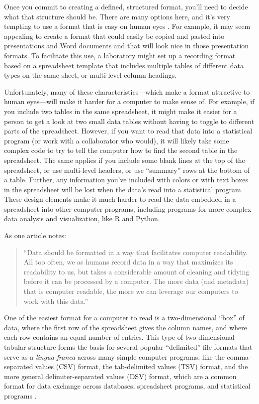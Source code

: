 \documentclass[]{tufte-book}
\begin{document}
Once you commit to creating a defined, structured format, you'll need to decide
what that structure should be. There are many options here, and it's very
tempting to use a format that is easy on human eyes
\citep{buffalo2015bioinformatics}. For example, it may seem appealing to create a
format that could easily be copied and pasted into presentations and Word
documents and that will look nice in those presentation formats. To facilitate
this use, a laboratory might set up a recording format based on a spreadsheet
template that includes multiple tables of different data types on the same
sheet, or multi-level column headings.

Unfortunately, many of these characteristics---which make a format attractive to
human eyes---will make it harder for a computer to make sense of. For example,
if you include two tables in the same spreadsheet, it might make it easier for a
person to get a look at two small data tables without having to toggle to
different parts of the spreadsheet. However, if you want to read that data into
a statistical program (or work with a collaborator who would), it will likely
take some complex code to try to tell the computer how to find the second table
in the spreadsheet. The same applies if you include some blank lines at the top
of the spreadsheet, or use multi-level headers, or use ``summary'' rows at the
bottom of a table. Further, any information you've included with colors or with
text boxes in the spreadsheet will be lost when the data's read into a
statistical program. These design elements make it much harder to read the data
embedded in a spreadsheet into other computer programs, including programs for
more complex data analysis and visualization, like R and Python.

As one article notes:

\begin{quote}
``Data should be formatted in a way that facilitates computer readability. All
too often, we as humans record data in a way that maximizes its readability to
us, but takes a considerable amount of cleaning and tidying before it can be
processed by a computer. The more data (and metadata) that is computer readable,
the more we can leverage our computers to work with this data.'' \citep{buffalo2015bioinformatics}
\end{quote}

One of the easiest format for a computer to read is a two-dimensional
``box'' of data, where the first row of the spreadsheet gives the column names,
and where each row contains an equal number of entries. This type of
two-dimensional tabular structure forms the basis for several popular
``delimited'' file formats that serve as a \emph{lingua franca} across many simple
computer programs, like the comma-separated values (CSV) format, the
tab-delimited values (TSV) format, and the more general delimiter-separated
values (DSV) format, which are a common format for data exchange across
databases, spreadsheet programs, and statistical programs \citep{janssens2014data, raymond2003art, buffalo2015bioinformatics}.
\end{document}
